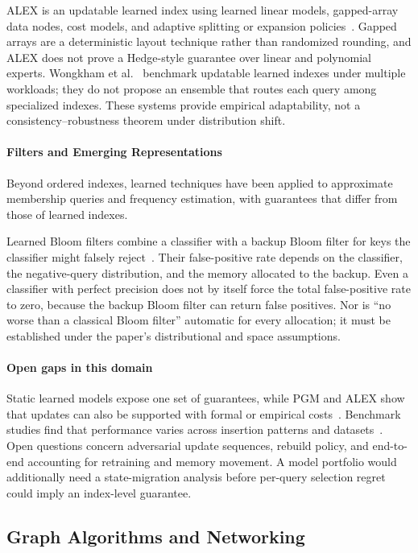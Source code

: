 \documentclass[acmsmall,screen,nonacm]{acmart}
\theoremstyle{acmdefinition}%
\begin{document}
ALEX is an updatable learned index using learned linear models, gapped-array data nodes, cost models, and adaptive splitting or expansion policies~\cite{ding2020alex}. Gapped arrays are a deterministic layout technique rather than randomized rounding, and ALEX does not prove a Hedge-style guarantee over linear and polynomial experts. Wongkham et al.~\cite{wongkham2022updatable} benchmark updatable learned indexes under multiple workloads; they do not propose an ensemble that routes each query among specialized indexes. These systems provide empirical adaptability, not a consistency--robustness theorem under distribution shift.

\paragraph{Filters and Emerging Representations}
Beyond ordered indexes, learned techniques have been applied to approximate membership queries and frequency estimation, with guarantees that differ from those of learned indexes.

Learned Bloom filters combine a classifier with a backup Bloom filter for keys the classifier might falsely reject~\cite{mitzenmacher2018sandwiching,mitzenmacher2021algorithms}. Their false-positive rate depends on the classifier, the negative-query distribution, and the memory allocated to the backup. Even a classifier with perfect precision does not by itself force the total false-positive rate to zero, because the backup Bloom filter can return false positives. Nor is ``no worse than a classical Bloom filter'' automatic for every allocation; it must be established under the paper's distributional and space assumptions.

\paragraph*{Open gaps in this domain}
Static learned models expose one set of guarantees, while PGM and ALEX show that updates can also be supported with formal or empirical costs~\cite{ferragina2020pgm,ding2020alex}. Benchmark studies find that performance varies across insertion patterns and datasets~\cite{wongkham2022updatable}. Open questions concern adversarial update sequences, rebuild policy, and end-to-end accounting for retraining and memory movement. A model portfolio would additionally need a state-migration analysis before per-query selection regret could imply an index-level guarantee.

\subsection{Graph Algorithms and Networking}
\label{subsec:graph}
\end{document}
